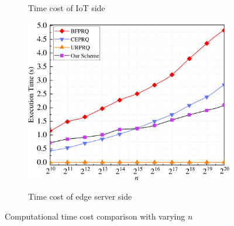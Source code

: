\documentclass[IEEE JOURNAL OF BIOMEDICAL AND HEALTH INFORMATICS]{IEEEtran}
\begin{document}
\begin{figure}
\begin{subfigure}[t]{0.3\textwidth}
		\caption{Time cost of IoT side}
		\label{com_2n}
	\end{subfigure}
	\quad
	\begin{subfigure}[t]{0.3\textwidth}
		\centering
		\includegraphics[width=1\textwidth]{com_3n}\\
		\caption{Time cost of edge server side}
		\label{com_3n}
	\end{subfigure}
	\caption{Computational time cost comparison with varying $n$}\label{computation_n}
\end{figure}
\end{document}
